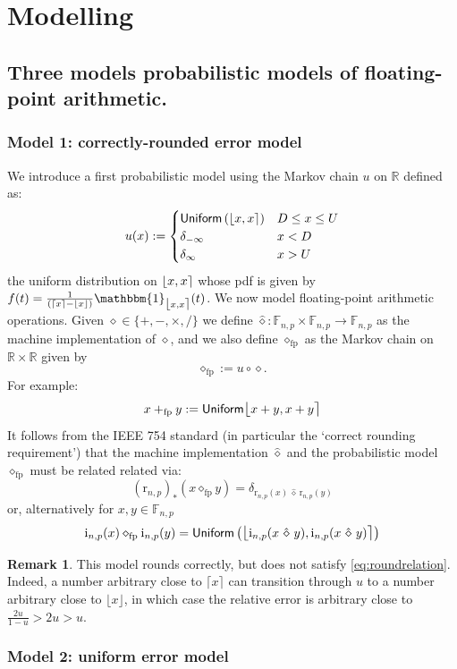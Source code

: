\documentclass[10pt,a4paper]{article}
\theoremstyle{plain}
\theoremstyle{definition}
\newtheorem{remark}[theorem]{Remark}
\newcommand{\F}[1][n,p]{\mathbb{F}_{#1}}
\newcommand{\R}{\mathbb{R}}
\newcommand{\Rep}[1][n,p]{\mathrm{i}_{#1}}
\newcommand{\Round}[1][n,p]{\mathrm{r}_{#1}}
\newcommand{\one}{\mathbbm{1}}
\newcommand{\Unif}{\mathsf{Uniform}}
\newcommand{\ceil}[1]{\lceil #1 \rceil}
\newcommand{\floor}[1]{\lfloor #1 \rfloor}
\newcommand{\fintvl}[1][x]{\mathlarger{\lfloor}#1,#1\mathlarger{\rceil}}
\newcommand{\fp}{_{\mathrm{fp}}}
\begin{document}
\section{Modelling}



\subsection{Three models probabilistic models of floating-point arithmetic.}


\subsubsection{Model 1: correctly-rounded error model}
We introduce a first probabilistic model using the Markov chain $u$ on $\R$ defined as:
\[
u(x):=\begin{cases}
\Unif\left(\fintvl\right)& D\leq x\leq U\\
\delta_{-\infty}& x< D\\
\delta_{\infty} & x>U\end{cases}
\]
the uniform distribution on $\fintvl$ whose pdf is given by $f(t)=\frac{1}{(\ceil{x}-\floor{x})}\one_{\fintvl}(t)$. We now model floating-point arithmetic operations. Given $\diamond\in \{+,-,\times,/\}$ we define $\widehat{\diamond}:\F\times \F\to \F$ as the machine implementation of $\diamond$, and we also define $\diamond\fp$ as the Markov chain on $\R\times \R$ given by
\[
\diamond\fp:=u\circ\diamond.
\]
For example:
\[
x+\fp y:=\Unif\fintvl[x+y]
\]
It follows from the IEEE 754 standard (in particular the `correct rounding requirement') that the machine implementation $\hat{\diamond}$ and the probabilistic model $\diamond\fp$ must be related related via:
\[
(\Round)_\ast(x\diamond\fp y)=\delta_{\Round(x)~\widehat{\diamond}~\Round(y)}
\]
or, alternatively for $x,y\in\F$
\[
\Rep(x)\diamond\fp \Rep(y)=\Unif\left(\fintvl[\Rep(x~\hat{\diamond}~y)]\right)
\]

\begin{remark}
This model rounds correctly, but does not satisfy \eqref{eq:roundrelation}. Indeed, a number arbitrary close to $\ceil{x}$ can transition through $u$ to a number arbitrary close to $\floor{x}$, in which case the relative error is arbitrary close to $\frac{2u}{1-u}>2u>u$.
\end{remark}

\subsubsection{Model 2: uniform error model}
\end{document}
